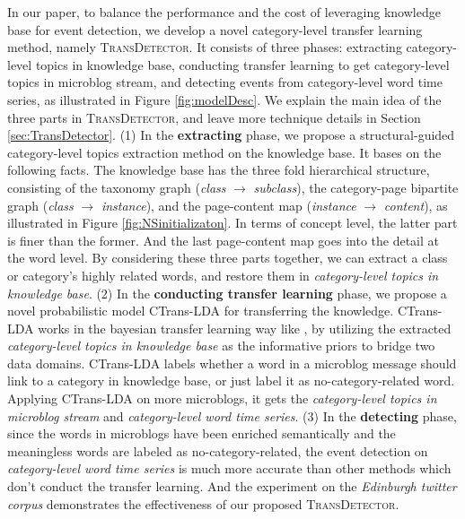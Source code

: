 \documentclass[runningheads,a4paper]{llncs}
\theoremstyle{exampstyle}
\begin{document}
In our paper, to balance the performance and the cost of leveraging knowledge base for event detection, we develop a novel category-level transfer learning method, namely \textsc{TransDetector}.
It consists of three phases: extracting category-level topics in knowledge base, conducting transfer learning to get category-level topics in microblog stream, and detecting events from category-level word time series, as illustrated in Figure \ref{fig:modelDesc}.
We explain the main idea of the three parts in \textsc{TransDetector}, and leave more technique details in Section \ref{sec:TransDetector}.
(1) In the \textbf{extracting} phase, we propose a structural-guided category-level topics extraction method on the knowledge base. 
It bases on the following facts. 
The knowledge base has the three fold hierarchical structure, consisting of the taxonomy graph (\textit{class} \(\rightarrow\) \textit{subclass}), the category-page bipartite graph (\textit{class} \(\rightarrow\) \textit{instance}), and the page-content map (\textit{instance} \(\rightarrow\) \textit{content}), as illustrated in Figure \ref{fig:NSinitializaton}.
In terms of concept level, the latter part is finer than the former. 
And the last page-content map goes into the detail at the word level. 
By considering these three parts together, we can extract a class or category's highly related words, and restore them in \textit{category-level topics in knowledge base}.
(2) In the \textbf{conducting transfer learning} phase, we propose a novel probabilistic model CTrans-LDA for transferring the knowledge.
CTrans-LDA works in the bayesian transfer learning way like \cite{dai2007transferring}, by utilizing the extracted \textit{category-level topics in knowledge base} as the informative priors to bridge two data domains. 
CTrans-LDA labels whether a word in a microblog message should link to a category in knowledge base, or just label it as no-category-related word.
Applying CTrans-LDA on more microblogs, it gets the \textit{category-level topics in microblog stream} and \textit{category-level word time series}.
(3) In the \textbf{detecting} phase, since the words in microblogs have been enriched semantically and the meaningless words are labeled as no-category-related, the event detection on \textit{category-level word time series} is much more accurate than other methods which don't conduct the transfer learning.
And the experiment on the \textit{Edinburgh twitter corpus} demonstrates the effectiveness of our proposed \textsc{TransDetector}.
\end{document}
